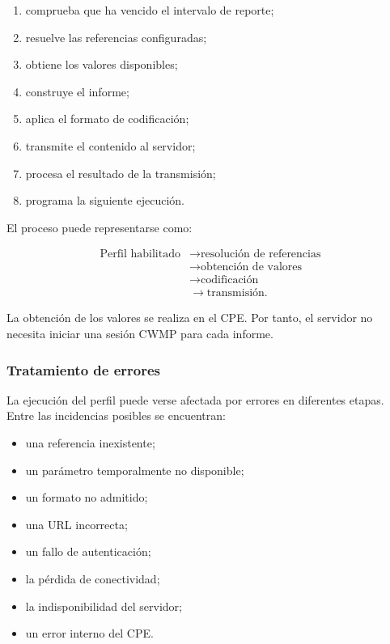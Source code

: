 \begin{enumerate}
    \item comprueba que ha vencido el intervalo de reporte;

    \item resuelve las referencias configuradas;

    \item obtiene los valores disponibles;

    \item construye el informe;

    \item aplica el formato de codificación;

    \item transmite el contenido al servidor;

    \item procesa el resultado de la transmisión;

    \item programa la siguiente ejecución.
\end{enumerate}

El proceso puede representarse como:

\[
\begin{aligned}
    \text{Perfil habilitado}
    &\longrightarrow
    \text{resolución de referencias}\\
    &\longrightarrow
    \text{obtención de valores}\\
    &\longrightarrow
    \text{codificación}\\
    &\longrightarrow
    \text{transmisión}.
\end{aligned}
\]

La obtención de los valores se realiza en el CPE. Por tanto, el servidor
no necesita iniciar una sesión CWMP para cada informe.


\subsubsection*{Tratamiento de errores}

La ejecución del perfil puede verse afectada por errores en diferentes
etapas. Entre las incidencias posibles se encuentran:

\begin{itemize}
    \item una referencia inexistente;
    \item un parámetro temporalmente no disponible;
    \item un formato no admitido;
    \item una URL incorrecta;
    \item un fallo de autenticación;
    \item la pérdida de conectividad;
    \item la indisponibilidad del servidor;
    \item un error interno del CPE.
\end{itemize}

